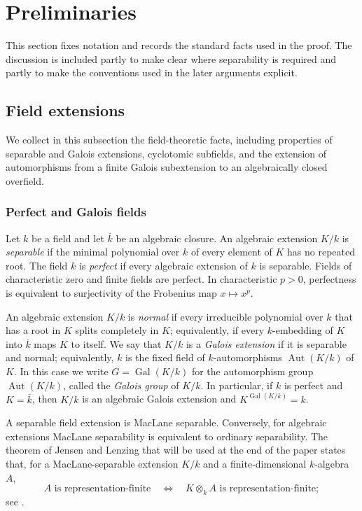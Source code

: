 \documentclass[11pt,letterpaper,reqno]{amsart}
\theoremstyle{definition}
\DeclareMathOperator{\Aut}{Aut}
\DeclareMathOperator{\Gal}{Gal}
\newcommand{\kkbar}{\overline{k}}
\begin{document}
\section{Preliminaries}\label{sec:preliminaries}

This section fixes notation and records the standard facts used in the
proof.  The discussion is included partly to make clear where separability
is required and partly to make the conventions used in the later arguments explicit.

\subsection{Field extensions}\label{subsec:field-preliminaries}
We collect in this subsection the field-theoretic facts, including properties of separable and Galois extensions,
cyclotomic subfields, and the extension of automorphisms from a finite
Galois subextension to an algebraically closed overfield. 

\subsubsection{Perfect and Galois fields}\label{Perfect and Galois fields}
Let $k$ be a field and let $\kkbar$ be an algebraic closure.  An algebraic
extension $K/k$ is \emph{separable} if the minimal polynomial over $k$ of
every element of $K$ has no repeated root.  The field $k$ is
\emph{perfect} if every algebraic extension of $k$ is separable.  Fields of
characteristic zero and finite fields are perfect.  In characteristic
$p>0$, perfectness is equivalent to surjectivity of the Frobenius map
$x\mapsto x^p$.


An algebraic extension $K/k$ is \emph{normal} if every irreducible polynomial
over $k$ that has a root in $K$ splits completely in $K$; equivalently, if every $k$-embedding of $K$ into $\overline{k}$ maps $K$ to itself.  
 We say that $K/k$ is a \emph{Galois
extension} if it is separable and normal; equivalently, $k$ is the fixed field of $k$-automorphisms $\Aut(K/k)$ of $K$. In this case
we write $G=\Gal(K/k)$ for the automorphism group $\Aut(K/k)$, called the
\emph{Galois group} of $K/k$.
In particular, if $k$ is perfect and $K=\kkbar$, then $K/k$ is an algebraic
Galois extension and $K^{\Gal(K/k)}=k$.



A separable field extension is MacLane separable.  Conversely, for
algebraic extensions MacLane separability is equivalent to ordinary
separability.  The theorem of Jensen and Lenzing that will be used at the
end of the paper states that, for a MacLane-separable extension $K/k$ and a
finite-dimensional $k$-algebra $A$,
\[
A\text{ is representation-finite}
\quad\Longleftrightarrow\quad
K\otimes_k A\text{ is representation-finite};
\]
see \cite[Theorem~3.3]{JensenLenzing}.
\end{document}
